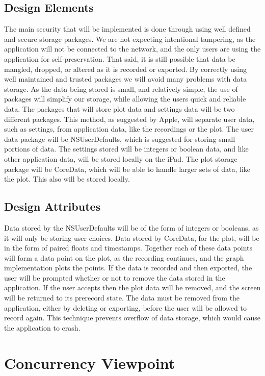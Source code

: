 \documentclass[onecolumn, draftclsnofoot,10pt, compsoc]{IEEEtran}
\begin{document}
\subsection{Design Elements}
The main security that will be implemented is done through using well defined and secure storage packages.
We are not expecting intentional tampering, as the application will not be connected to the network, and the only users are using the application for self-preservation.
That said, it is still possible that data be mangled, dropped, or altered as it is recorded or exported.
By correctly using well maintained and trusted packages we will avoid many problems with data storage.
As the data being stored is small, and relatively simple, the use of packages will simplify our storage, while allowing the users quick and reliable data.
The packages that will store plot data and settings data will be two different packages.
This method, as suggested by Apple\cite{coreApple}, will separate user data, such as settings, from application data, like the recordings or the plot.
The user data package will be NSUserDefaults, which is suggested for storing small portions of data.
The settings stored will be integers or boolean data, and like other application data, will be stored locally on the iPad.
The plot storage package will be CoreData, which will be able to handle larger sets of data, like the plot.
This also will be stored locally.

\subsection{Design Attributes}
Data stored by the NSUserDefaults will be of the form of integers or booleans, as it will only be storing user choices.
Data stored by CoreData, for the plot, will be in the form of paired floats and timestamps.
Together each of these data points will form a data point on the plot, as the recording continues, and the graph implementation plots the points.
If the data is recorded and then exported, the user will be prompted whether or not to remove the data stored in the application.
If the user accepts then the plot data will be removed, and the screen will be returned to its prerecord state.
The data must be removed from the application, either by deleting or exporting, before the user will be allowed to record again.
This technique prevents overflow of data storage, which would cause the application to crash.

\section{Concurrency Viewpoint}
\end{document}
